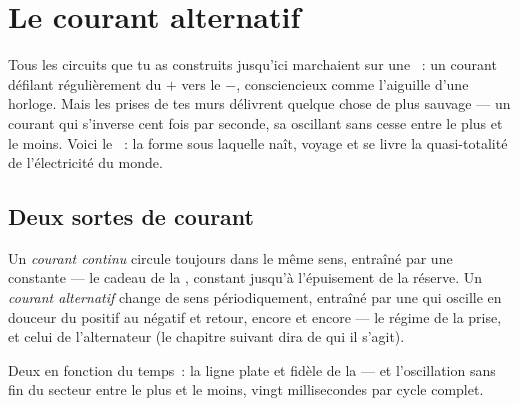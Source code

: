 \chapter{Le courant alternatif}\label{ch:g9:alternating-current}

Tous les circuits que tu as construits jusqu'ici marchaient sur une
~: un courant défilant régulièrement du $+$ vers le $-$,
consciencieux comme l'aiguille d'une horloge. Mais les prises de tes
murs délivrent quelque chose de plus sauvage --- un courant qui
s'inverse cent fois par seconde, sa  oscillant sans cesse entre
le plus et le moins. Voici le ~: la forme sous
laquelle naît, voyage et se livre la quasi-totalité de l'électricité
du monde.

\section{Deux sortes de courant}

\begin{definition}\label{def:g9:alternating-current:dcac}
Un \emph{courant continu} circule toujours dans
le même sens, entraîné par une  constante --- le cadeau de la
, constant jusqu'à l'épuisement de la réserve. Un \emph{courant
alternatif} change de sens périodiquement,
entraîné par une  qui oscille en douceur du positif au négatif
et retour, encore et encore --- le régime de la prise, et celui de
l'alternateur (le chapitre suivant dira de qui il s'agit).
\end{definition}

\begin{omfigure}

{\small Deux  en fonction du temps~: la ligne plate et fidèle
de la  --- et l'oscillation sans fin du secteur entre le plus et
le moins, vingt millisecondes par cycle complet.}
\end{omfigure}

